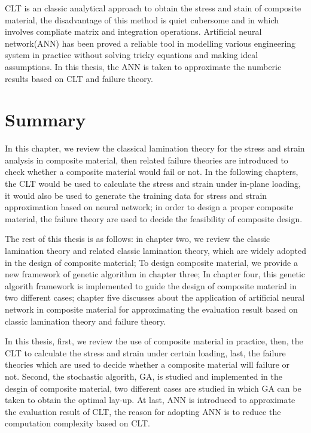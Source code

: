 CLT is an classic analytical approach to obtain the stress and stain of
composite material, the disadvantage of this method is quiet cubersome and in
which involves compliate matrix and integration operations. Artificial neural
network(ANN) has been proved a reliable tool in modelling various engineering
system in practice without solving tricky equations and making ideal
assumptions. In this thesis, the ANN is taken to approximate the numberic
results based on CLT and failure theory.

\section{Summary}

In this chapter, we review the classical lamination theory for the stress and
strain analysis in composite material, then related failure theories are
introduced to check whether a composite material would fail or not. In the
following chapters, the CLT would be used to calculate the stress and strain
under in-plane loading, it would also be used to generate the training data for
stress and strain approximation based on neural network; in order to design a
proper composite material, the failure theory are used to decide the feasibility
of composite design.

The rest of this thesis is as follows: in chapter two, we review the classic
lamination theory and related classic lamination theory, which are widely
adopted in the design of composite material; To design composite material, we
provide a new framework of genetic algorithm in chapter three; In chapter four,
this genetic algorith framework is implemented to guide the design of composite
material in two different cases; chapter five discusses about the application of
artificial neural network in composite material for approximating the evaluation
result based on classic lamination theory and failure theory.

In this thesis, first, we review the use of composite material in practice,
then, the CLT to calculate the stress and strain under certain loading, last,
the failure theories which are used to decide whether a composite material will
failure or not. Second, the stochastic algorith, GA, is studied and implemented
in the desgin of composite material, two different cases are studied in which GA
can be taken to obtain the optimal lay-up. At last, ANN is introduced to
approximate the evaluation result of CLT, the reason for adopting ANN is to
reduce the computation complexity based on CLT.

